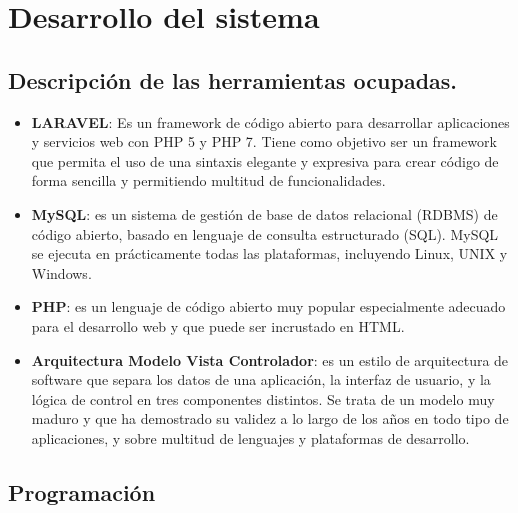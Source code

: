\section{Desarrollo del sistema}
\subsection{Descripción de las herramientas ocupadas.}

\begin{itemize}


\item \textbf{LARAVEL}: Es un framework de código abierto para desarrollar aplicaciones y servicios web con PHP 5 y PHP 7. Tiene como objetivo ser un framework que permita el uso de una sintaxis elegante y expresiva para crear código de forma sencilla y permitiendo multitud de funcionalidades.

\item \textbf{MySQL}: es un sistema de gestión de base de datos relacional (RDBMS) de código abierto, basado en lenguaje de consulta estructurado (SQL). MySQL se ejecuta en prácticamente todas las plataformas, incluyendo Linux, UNIX y Windows.

\item \textbf{PHP}: es un lenguaje de código abierto muy popular especialmente adecuado para el desarrollo web y que puede ser incrustado en HTML.

\item \textbf{Arquitectura Modelo Vista Controlador}: es un estilo de arquitectura de software que separa los datos de una aplicación, la interfaz de usuario, y la lógica de control en tres componentes distintos. Se trata de un modelo muy maduro y que ha demostrado su validez a lo largo de los años en todo tipo de aplicaciones, y sobre multitud de lenguajes y plataformas de desarrollo.

\end{itemize}



\subsection{Programación}